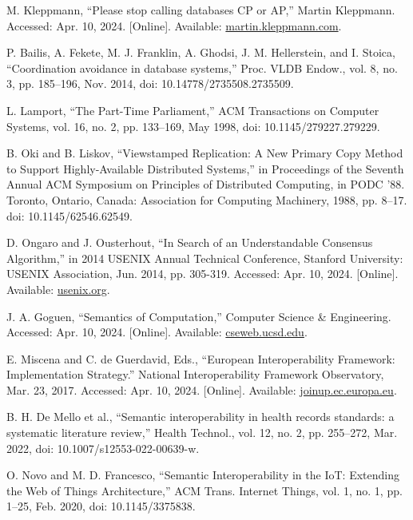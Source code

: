 \documentclass{article}
\begin{document}
\begin{thebibliography}{99}
    M. Kleppmann, “Please stop calling databases CP or AP,” Martin Kleppmann. Accessed: Apr. 10, 2024. [Online]. Available: \href{https://martin.kleppmann.com/2015/05/11/please-stop-calling-databases-cp-or-ap.html}{martin.kleppmann.com}.

    P. Bailis, A. Fekete, M. J. Franklin, A. Ghodsi, J. M. Hellerstein, and I. Stoica, “Coordination avoidance in database systems,” Proc. VLDB Endow., vol. 8, no. 3, pp. 185–196, Nov. 2014, doi: 10.14778/2735508.2735509.

    L. Lamport, “The Part-Time Parliament,” ACM Transactions on Computer Systems, vol. 16, no. 2, pp. 133–169, May 1998, doi: 10.1145/279227.279229.

    B. Oki and B. Liskov, “Viewstamped Replication: A New Primary Copy Method to Support Highly-Available Distributed Systems,” in Proceedings of the Seventh Annual ACM Symposium on Principles of Distributed Computing, in PODC ’88. Toronto, Ontario, Canada: Association for Computing Machinery, 1988, pp. 8–17. doi: 10.1145/62546.62549.

    D. Ongaro and J. Ousterhout, “In Search of an Understandable Consensus Algorithm,” in 2014 USENIX Annual Technical Conference, Stanford University: USENIX Association, Jun. 2014, pp. 305-319. Accessed: Apr. 10, 2024. [Online]. Available: \href{https://www.usenix.org/conference/atc14/technical-sessions/presentation/ongaro}{usenix.org}.

    J. A. Goguen, “Semantics of Computation,” Computer Science \& Engineering. Accessed: Apr. 10, 2024. [Online]. Available: \href{https://cseweb.ucsd.edu/~goguen/projs/sem.html}{cseweb.ucsd.edu}.

    E. Miscena and C. de Guerdavid, Eds., “European Interoperability Framework:
    Implementation Strategy.” National Interoperability Framework Observatory, Mar. 23,
    2017. Accessed: Apr. 10, 2024. [Online]. Available: \href{https://joinup.ec.europa.eu/collection/nifo-national-interoperability-framework-
    observatory/glossary/term/semantic-interoperability}{joinup.ec.europa.eu}.

    B. H. De Mello et al., “Semantic interoperability in health records standards: a systematic literature review,” Health Technol., vol. 12, no. 2, pp. 255–272, Mar. 2022, doi: 10.1007/s12553-022-00639-w.

    O. Novo and M. D. Francesco, “Semantic Interoperability in the IoT: Extending the Web
    of Things Architecture,” ACM Trans. Internet Things, vol. 1, no. 1, pp. 1–25, Feb. 2020,
    doi: 10.1145/3375838.


\end{thebibliography}
\end{document}
